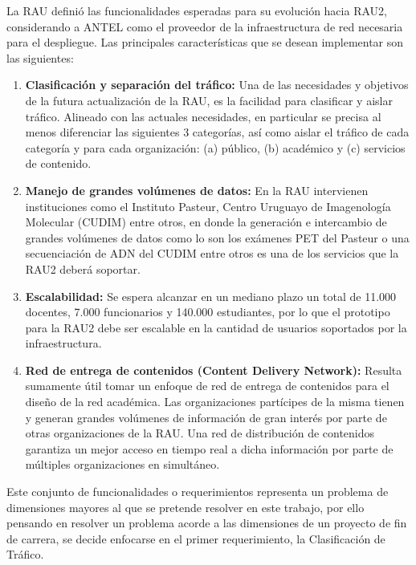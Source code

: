 La RAU definió las funcionalidades esperadas para su evolución hacia RAU2, considerando a ANTEL como el proveedor de la infraestructura de red necesaria para el despliegue. Las principales características que se desean implementar son las siguientes:


\begin{enumerate}
\item \textbf{Clasificación y separación del tráfico:} Una de las necesidades y objetivos de la futura actualizaci\'on de la RAU, es la facilidad para clasificar y aislar tráfico. Alineado con las actuales necesidades, en particular se precisa al menos diferenciar las siguientes 3 categorías, as\'i como aislar el tr\'afico de cada categoría y para cada organizaci\'on: (a) público, (b) académico y (c) servicios de contenido.

\item \textbf{Manejo de grandes volúmenes de datos:} En la RAU intervienen instituciones como el Instituto Pasteur, Centro Uruguayo de Imagenología Molecular (CUDIM) entre otros, en donde la generación e intercambio de grandes volúmenes de datos como lo son los exámenes PET del Pasteur o una secuenciación de ADN del CUDIM entre otros es una de los servicios que la RAU2 deber\'a soportar.

\item \textbf{Escalabilidad:} Se espera alcanzar en un mediano plazo un total de 11.000 docentes, 7.000 funcionarios y 140.000 estudiantes, por lo que el prototipo para la RAU2 debe ser escalable en la cantidad de usuarios soportados por la infraestructura.

\item \textbf{Red de entrega de contenidos (Content Delivery Network):} Resulta sumamente útil tomar un enfoque de red de entrega de contenidos para el diseño de la red académica. Las organizaciones partícipes de la misma tienen y generan grandes volúmenes de información de gran interés por parte de otras organizaciones de la RAU. Una red de distribución de contenidos garantiza un mejor acceso en tiempo real a dicha información por parte de múltiples organizaciones en simultáneo. 
 
\end{enumerate}

Este conjunto de funcionalidades o requerimientos representa un problema de dimensiones mayores al que se pretende resolver en este trabajo, por ello pensando en resolver un problema acorde a las dimensiones de un proyecto de fin de carrera, se decide enfocarse en el primer requerimiento, la Clasificación de Tr\'afico.

